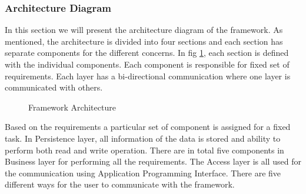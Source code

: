 \subsubsection{Architecture Diagram} 
In this section we will present the architecture diagram of the framework.  As mentioned, the architecture is divided into four sections and each section has separate components for the different concerns. In fig \ref{fig:labelOfFrameworkArchitecture}, each section is defined with the individual components. Each component is responsible for fixed set of requirements. Each layer has a bi-directional communication where one layer is communicated with others.
\begin{figure}[htbp]
	\centering
	
	
	\caption{Framework Architecture}
	\label{fig:labelOfFrameworkArchitecture}
\end{figure}
Based on the requirements a particular set of component is assigned for a fixed task. In Persistence layer, all information of the data is stored and ability to perform both read and write operation. There are in total five components in Business layer for performing all the requirements. The Access layer is all used for the communication using Application Programming Interface. There are five different ways for the user to communicate with the framework.
